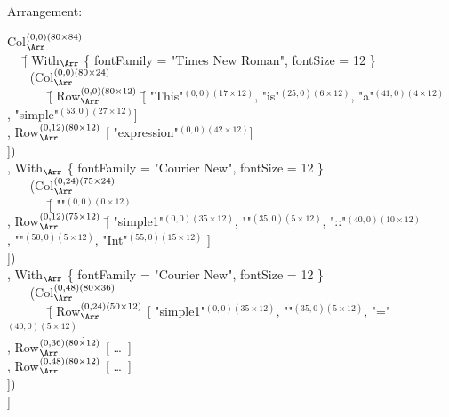 Arrangement:
\small \ttfamily
\begin{tabbing}
Col$_{\Arr}^{(0,0)(80\times84)}$ \\
~~ \= [ With$_{\Arr}$ \{ fontFamily = "Times New Roman", fontSize = 12 \}\\
      \> ~~~ (Col$_{\Arr}^{(0,0)(80\times24)}$ \\
      \> ~~~~~~ \= [ Row$_{\Arr}^{(0,0)(80\times12)}$ \= [ "This"$^{(0,0)(17\times12)}$, "is"$^{(25,0)(6\times12)}$, "a"$^{(41,0)(4\times12)}$ \\
      \>       \>                                                      \>, "simple"$^{(53,0)(27\times12)}$]\\
      \>       \> , Row$_{\Arr}^{(0,12)(80\times12)}$  [ "expression"$^{(0,0)(42\times12)}$]\\
      \>       \> ])\\
                    
      \> , With$_{\Arr}$ \{ fontFamily = "Courier New",  fontSize = 12 \}\\
      \> ~~~ (Col$_{\Arr}^{(0,24)(75\times24)}$\\
      \> ~~~~~~ \= [ ""$^{(0,0)(0\times12)}$\\
      \>      \> , Row$_{\Arr}^{(0,12)(75\times12)}$ \= [ "simple1"$^{(0,0)(35\times12)}$, "\textvisiblespace"$^{(35,0)(5\times12)}$, "::"$^{(40,0)(10\times12)}$\\
      \>      \>                                                      \> , "\textvisiblespace"$^{(50,0)(5\times12)}$, "Int"$^{(55,0)(15\times12)}$ ]\\

      \>      \>  ])\\
                    
      \> , With$_{\Arr}$ \{ fontFamily = "Courier New",  fontSize = 12 \}\\
      \> ~~~ (Col$_{\Arr}^{(0,48)(80\times36)}$\\
      \> ~~~~~~ \= [  Row$_{\Arr}^{(0,24)(50\times12)}$ [ "simple1"$^{(0,0)(35\times12)}$, "\textvisiblespace"$^{(35,0)(5\times12)}$, "="$^{(40,0)(5\times12)}$ ]\\
      \>      \> , Row$_{\Arr}^{(0,36)(80\times12)}$ [ \dots~]\\
      \>      \> , Row$_{\Arr}^{(0,48)(80\times12)}$ [ \dots~]\\
      \>      \> ])\\
      \> ]

\end{tabbing}
\rmfamily \normalsize


